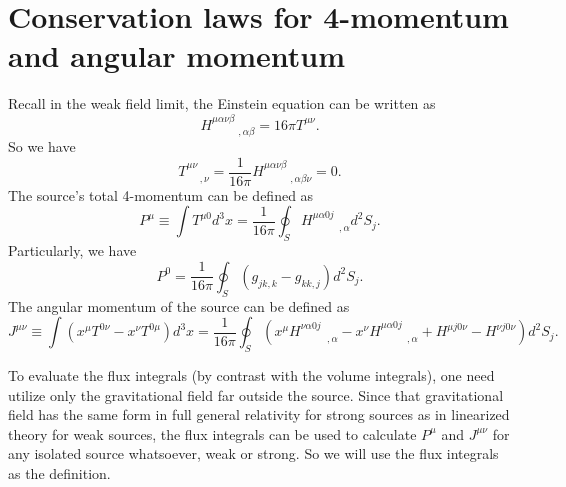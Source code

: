 \section{Conservation laws for 4-momentum and angular momentum}
Recall in the weak field limit, the Einstein equation can be written as
\[H^{\mu\alpha\nu\beta}_{\phantom{****},\alpha
\beta} = 16\pi T^{\mu\nu}.\]
So we have
\[T^{\mu\nu}_{\phantom{**},\nu} = \frac{1}{16\pi}H^{\mu\alpha\nu\beta}_{\phantom{****},\alpha\beta\nu} = 0.\]
The source's total 4-momentum can be defined as
\[P^{\mu} \equiv \int T^{\mu 0}d^3x = \frac{1}{16\pi} \oint_{S} H^{\mu\alpha 0 j}_{\phantom{****},\alpha} d^2 S_j .\]
Particularly, we have
\[P^0 = \frac{1}{16\pi} \oint_{S} (g_{jk,k} - g_{kk,j})d^2S_{j} .\]
The angular momentum of the source can be defined as
\[J^{\mu\nu} \equiv \int (x^{\mu} T^{0\nu} - x^{\nu} T^{0\mu}) d^3x  = \frac{1}{16\pi} \oint_S (x^{\mu}H^{\nu\alpha 0 j}_{\phantom{****},\alpha} - x^{\nu}H^{\mu\alpha 0 j}_{\phantom{****},\alpha} + H^{\mu j 0 \nu} - H^{\nu j 0 \nu}) d^2 S_j .\]
\begin{note}
To evaluate the flux integrals (by contrast with the volume
integrals), one need utilize only the gravitational field far outside the source. Since that gravitational field has the same form in full general relativity for strong sources as in linearized theory for weak sources, the flux integrals can be used to calculate $P^{\mu}$ and $J^{\mu\nu}$ for any isolated source whatsoever, weak or strong. So we will use the flux integrals as the definition.
\end{note}

